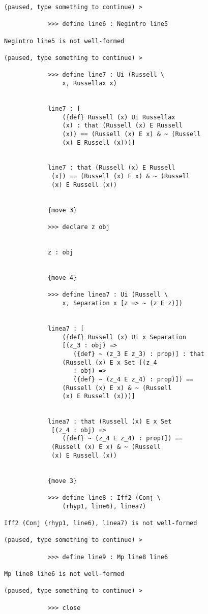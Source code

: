 \documentclass[12pt]{article}
\begin{document}
\begin{verbatim}
(paused, type something to continue) >

            >>> define line6 : Negintro line5

Negintro line5 is not well-formed

(paused, type something to continue) >

            >>> define line7 : Ui (Russell \
                x, Russellax x)


            line7 : [
                ({def} Russell (x) Ui Russellax 
                (x) : that (Russell (x) E Russell 
                (x)) == (Russell (x) E x) & ~ (Russell 
                (x) E Russell (x)))]


            line7 : that (Russell (x) E Russell 
             (x)) == (Russell (x) E x) & ~ (Russell 
             (x) E Russell (x))


            {move 3}

            >>> declare z obj


            z : obj


            {move 4}

            >>> define linea7 : Ui (Russell \
                x, Separation x [z => ~ (z E z)])


            linea7 : [
                ({def} Russell (x) Ui x Separation 
                [(z_3 : obj) => 
                   ({def} ~ (z_3 E z_3) : prop)] : that 
                (Russell (x) E x Set [(z_4 
                   : obj) => 
                   ({def} ~ (z_4 E z_4) : prop)]) == 
                (Russell (x) E x) & ~ (Russell 
                (x) E Russell (x)))]


            linea7 : that (Russell (x) E x Set 
             [(z_4 : obj) => 
                ({def} ~ (z_4 E z_4) : prop)]) == 
             (Russell (x) E x) & ~ (Russell 
             (x) E Russell (x))


            {move 3}

            >>> define line8 : Iff2 (Conj \
                (rhyp1, line6), linea7)

Iff2 (Conj (rhyp1, line6), linea7) is not well-formed

(paused, type something to continue) >

            >>> define line9 : Mp line8 line6

Mp line8 line6 is not well-formed

(paused, type something to continue) >

            >>> close



\end{verbatim}
\end{document}

